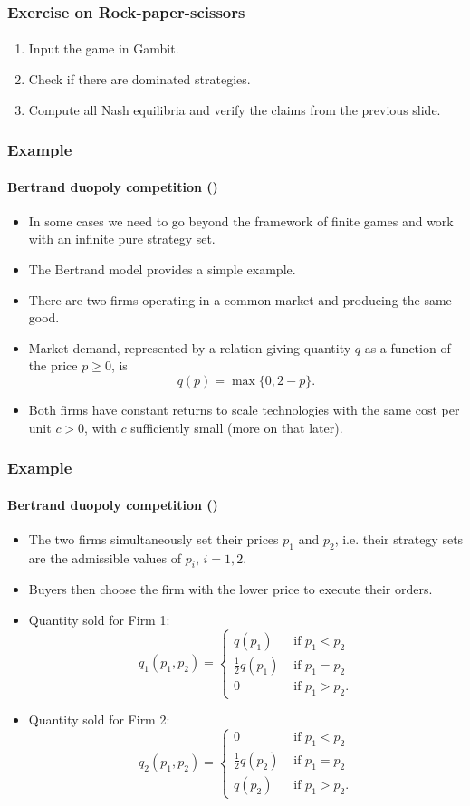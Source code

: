 \documentclass[10pt]{beamer}
\theoremstyle{definition}
\begin{document}
\begin{frame}[fragile]
\frametitle{Exercise on Rock-paper-scissors}
\framesubtitle{}
\begin{enumerate}\itemsep1em
\item Input the game in Gambit.
\item Check if there are dominated strategies.
\item Compute all Nash equilibria and verify the claims from the previous slide.
\end{enumerate}
\end{frame}


\begin{frame}[fragile]\setcounter{slidenum}{1}
	\frametitle{Example }
	\framesubtitle{Bertrand duopoly competition ()}
	\begin{itemize}\itemsep1em
		\item In some cases we need to go beyond the framework of finite games and work with an infinite pure strategy set. 
		\item The Bertrand model provides a simple example.
		\item There are two firms operating in a common market and producing the same good.
		\item Market demand, represented by a relation giving quantity $q$ as a function of the price $p \geq 0$, is
		\[q(p) = \max\{0,2-p\}. \]
		\item Both firms have constant returns to scale technologies with the same cost per unit $c>0$, with $c$ sufficiently small (more on that later).
	\end{itemize}
\end{frame}


\begin{frame}[fragile]
	\frametitle{Example }
	\framesubtitle{Bertrand duopoly competition ()}
	\begin{itemize}\itemsep1em
		\item The two firms simultaneously set their prices $p_1$ and $p_2$, i.e. their strategy sets are the admissible values of $p_i$, $i=1,2$.
		\item Buyers then choose the firm with the lower price to execute their orders.
		\item Quantity sold for Firm 1:
		\[ q_1(p_1,p_2) = \left\{ \begin{array}{ll}
			q(p_1) &\text{ if } p_1<p_2 \\
			\frac{1}{2}q(p_1) &\text{ if } p_1=p_2\\
			0 &\text{ if } p_1>p_2.
		\end{array} \right. \]
				\item Quantity sold for Firm 2:
		\[ q_2(p_1,p_2) = \left\{ \begin{array}{ll}
			0 &\text{ if } p_1<p_2 \\
			\frac{1}{2}q(p_2) &\text{ if } p_1=p_2\\
			q(p_2) &\text{ if } p_1>p_2.
		\end{array} \right. \]
	\end{itemize}
\end{frame}
\end{document}
